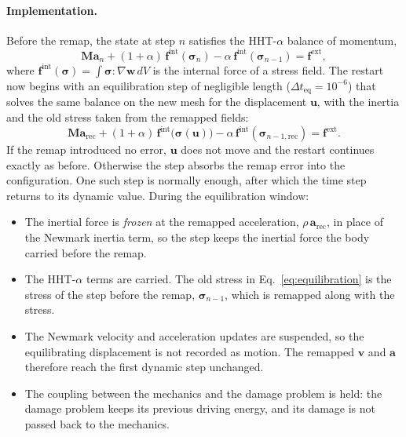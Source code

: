 \paragraph{Implementation.}
Before the remap, the state at step $n$ satisfies the HHT-$\alpha$ balance of momentum,
\begin{equation}
    \mathbf{M}\mathbf{a}_n + (1+\alpha)\,\mathbf{f}^\text{int}(\boldsymbol{\sigma}_n) - \alpha\,\mathbf{f}^\text{int}(\boldsymbol{\sigma}_{n-1}) = \mathbf{f}^\text{ext},\label{eq:hht_balance}
\end{equation}
where $\mathbf{f}^\text{int}(\boldsymbol{\sigma}) = \int \boldsymbol{\sigma} : \nabla\mathbf{w}\,dV$ is the internal force of a stress field. The restart now begins with an equilibration step of negligible length ($\Delta t_\text{eq}=10^{-6}$) that solves the same balance on the new mesh for the displacement $\mathbf{u}$, with the inertia and the old stress taken from the remapped fields:
\begin{equation}
    \mathbf{M}\mathbf{a}_\text{rec} + (1+\alpha)\,\mathbf{f}^\text{int}\big(\boldsymbol{\sigma}(\mathbf{u})\big) - \alpha\,\mathbf{f}^\text{int}(\boldsymbol{\sigma}_{n-1,\text{rec}}) = \mathbf{f}^\text{ext}.\label{eq:equilibration}
\end{equation}
If the remap introduced no error, $\mathbf{u}$ does not move and the restart continues exactly as before. Otherwise the step absorbs the remap error into the configuration. One such step is normally enough, after which the time step returns to its dynamic value. During the equilibration window:
\begin{itemize}
    \item The inertial force is \emph{frozen} at the remapped acceleration, $\rho\,\mathbf{a}_\text{rec}$, in place of the Newmark inertia term, so the step keeps the inertial force the body carried before the remap.
    \item The HHT-$\alpha$ terms are carried. The old stress in Eq.~\eqref{eq:equilibration} is the stress of the step before the remap, $\boldsymbol{\sigma}_{n-1}$, which is remapped along with the stress. 
    \item The Newmark velocity and acceleration updates are suspended, so the equilibrating displacement is not recorded as motion. The remapped $\mathbf{v}$ and $\mathbf{a}$ therefore reach the first dynamic step unchanged.
    \item The coupling between the mechanics and the damage problem is held: the damage problem keeps its previous driving energy, and its damage is not passed back to the mechanics.
\end{itemize}


